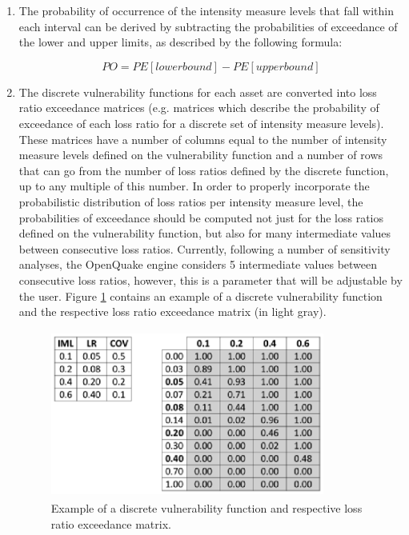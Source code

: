 \begin{enumerate}
\item The probability of occurrence of the intensity measure levels that fall within each interval can be derived by subtracting the probabilities of exceedance of the lower and upper limits, as described by the following formula:

\begin{equation}
PO= PE[lower bound]-PE[upper bound]
\end{equation}

\item The discrete vulnerability functions for each asset are converted into loss ratio exceedance matrices (e.g. matrices which describe the probability of exceedance of each loss ratio for a discrete set of intensity measure levels). These matrices have a number of columns equal to the number of intensity measure levels defined on the vulnerability function and a number of rows that can go from the number of loss ratios defined by the discrete function, up to any multiple of this number. In order to properly incorporate the probabilistic distribution of loss ratios per intensity measure level, the probabilities of exceedance should be computed not just for the loss ratios defined on the vulnerability function, but also for many intermediate values between consecutive loss ratios. Currently, following a number of sensitivity analyses, the OpenQuake engine considers 5 intermediate values between consecutive loss ratios, however, this is a parameter that will be adjustable by the user. Figure \ref{fig:LREM} contains an example of a discrete vulnerability function and the respective loss ratio exceedance matrix (in light gray).

\begin{figure}[htb]
\centering
\includegraphics[width=9cm,height=5.5cm]{./Figures/Part_Risk/LREM.eps}
\caption{Example of a discrete vulnerability function and respective loss ratio exceedance matrix.}
\label{fig:LREM}
\end{figure}


\end{enumerate}
